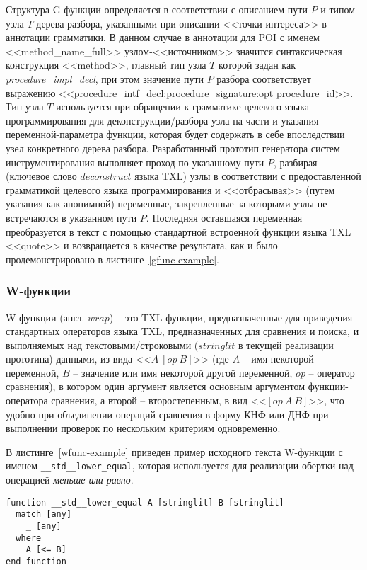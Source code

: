 Структура G-функции определяется в соответствии с описанием пути $P$ и типом узла $T$ дерева разбора, указанными при описании <<точки интереса>> в аннотации грамматики.
В данном случае в аннотации для POI с именем <<method\_name\_full>> узлом-<<источником>> значится синтаксическая конструкция <<method>>, главный тип узла $T$ которой задан как \textit{procedure\_impl\_decl}, при этом значение пути $P$ разбора соответствует выражению <<procedure\_intf\_decl:procedure\_signature:opt procedure\_id>>.
Тип узла $T$ используется при обращении к грамматике целевого языка программирования для деконструкции/разбора узла на части и указания переменной-параметра функции, которая будет содержать в себе впоследствии узел конкретного дерева разбора.
Разработанный прототип генератора систем инструментирования выполняет проход по указанному пути $P$, разбирая (ключевое слово $deconstruct$ языка TXL) узлы в соответствии с предоставленной грамматикой целевого языка программирования и <<отбрасывая>> (путем указания как анонимной) переменные, закрепленные за которыми узлы не встречаются в указанном пути $P$.
Последняя оставшаяся переменная преобразуется в текст с помощью стандартной встроенной функции языка TXL <<quote>> и возвращается в качестве результата, как и было продемонстрировано в листинге~\ref{gfunc-example}.

\subsubsection{W-функции}

W-функции (англ. $wrap$) -- это TXL функции, предназначенные для приведения стандартных операторов языка TXL, предназначенных для сравнения и поиска, и выполняемых над текстовыми/строковыми ($stringlit$ в текущей реализации прототипа) данными, из вида <<$A~[op~B]$>> (где $A$ -- имя некоторой переменной, $B$ -- значение или имя некоторой другой переменной, $op$ -- оператор сравнения), в котором один аргумент является основным аргументом функции-оператора сравнения, а второй -- второстепенным, в вид <<$[op~A~B]$>>, что удобно при объединении операций сравнения в форму КНФ или ДНФ при выполнении проверок по нескольким критериям одновременно.

В листинге~\ref{wfunc-example} приведен пример исходного текста W-функции с именем \lstinline{__std__lower_equal}, которая используется для реализации обертки над операцией \textit{меньше или равно}.

\begin{lstlisting}[frame=single, language=TXL, label={wfunc-example}, caption={Пример синтезированной W-функции.}]
function __std__lower_equal A [stringlit] B [stringlit]
  match [any]
    _ [any]
  where
    A [<= B]
end function
\end{lstlisting}

